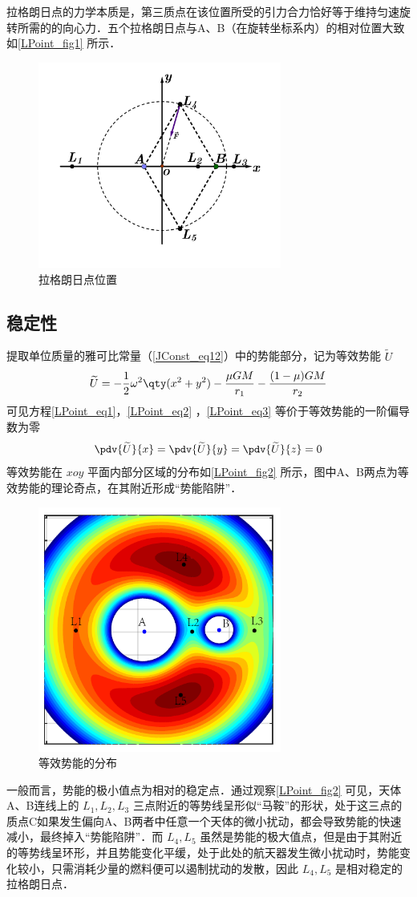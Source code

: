 拉格朗日点的力学本质是，第三质点在该位置所受的引力合力恰好等于维持匀速旋转所需的的向心力．五个拉格朗日点与A、B（在旋转坐标系内）的相对位置大致如\autoref{LPoint_fig1} 所示．
\begin{figure}[ht]
\centering
\includegraphics[width=8cm]{./figures/LPoint1.pdf}
\caption{拉格朗日点位置} \label{LPoint_fig1}
\end{figure}

\subsection{稳定性}
提取单位质量的雅可比常量（\autoref{JConst_eq12}）中的势能部分，记为等效势能 $\widetilde{U}$ 
\begin{equation}%
\widetilde{U}=-\frac{1}{2}\omega^2\qty(x^2+y^2)-\frac{\mu GM}{r_1}-\frac{(1-\mu) GM}{r_2}
\end{equation}
可见方程\autoref{LPoint_eq1}，\autoref{LPoint_eq2} ，\autoref{LPoint_eq3} 等价于等效势能的一阶偏导数为零
 \begin{equation}%
\pdv{\widetilde{U}}{x}=\pdv{\widetilde{U}}{y}=\pdv{\widetilde{U}}{z}=0
\end{equation}
等效势能在 $xoy$ 平面内部分区域的分布如\autoref{LPoint_fig2} 所示，图中A、B两点为等效势能的理论奇点，在其附近形成“势能陷阱”． 
\begin{figure}[ht]
\centering
\includegraphics[width=8cm]{./figures/LPoint2.pdf}
\caption{等效势能的分布} \label{LPoint_fig2}
\end{figure}

一般而言，势能的极小值点为相对的稳定点．通过观察\autoref{LPoint_fig2} 可见，天体A、B连线上的 $L_1,L_2,L_3$ 三点附近的等势线呈形似“马鞍”的形状，处于这三点的质点C如果发生偏向A、B两者中任意一个天体的微小扰动，都会导致势能的快速减小，最终掉入“势能陷阱”．而 $L_4,L_5$ 虽然是势能的极大值点，但是由于其附近的等势线呈环形，并且势能变化平缓，处于此处的航天器发生微小扰动时，势能变化较小，只需消耗少量的燃料便可以遏制扰动的发散，因此 $L_4,L_5$ 是相对稳定的拉格朗日点．  


